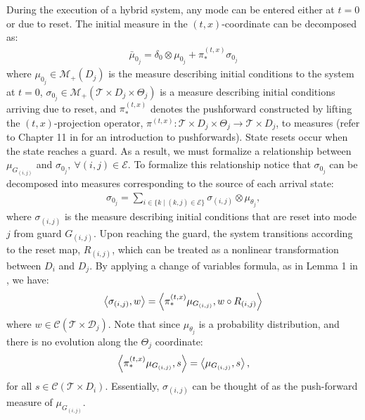 During the execution of a hybrid system, any mode can be entered either at $t=0$ or due to reset.
The initial measure in the $(t,x)$-coordinate can be decomposed as:
\begin{align}
  \bar\mu_{0_j}=\delta_0\otimes\mu_{0_j}+\pi^{(t,x)}_*\sigma_{0_j}
\end{align}
where $\mu_{0_j}\in \mathcal M_+(D_j)$ is the measure describing initial conditions to the system at $t=0$, $\sigma_{0_j}\in \mathcal M_+(\mathcal T\times D_j\times \Theta_j)$ is a measure describing initial conditions arriving due to reset, and $\pi^{(t,x)}_*$ denotes the pushforward constructed by lifting the $(t,x)$-projection operator, $\pi^{(t,x)}: \mathcal T\times D_j\times \Theta_j \to \mathcal T\times D_j$, to measures (refer to Chapter 11 in \cite{lee2003smooth} for an introduction to pushforwards). 
State resets occur when the state reaches a guard. 
As a result, we must formalize a relationship between $\mu_{ G_{(i,j)}}$ and $\sigma_{0_j},~\forall (i,j)\in \mathcal E$.
To formalize this relationship notice that $\sigma_{0_j}$ can be decomposed into measures corresponding to the source of each arrival state:
\begin{align}
  \sigma_{0_j}=\sum_{i\in \{k\mid (k,j)\in \mathcal E\}} \sigma_{(i,j)}\otimes \mu_{\theta_j},
\end{align}
where $\sigma_{(i,j)}$ is the measure describing initial conditions that are reset into mode $j$ from guard $G_{(i,j)}$.
Upon reaching the guard, the system transitions according to the reset map, $R_{(i,j)}$, which can be treated as a nonlinear transformation between $D_i$ and $D_j$.
By applying a change of variables formula, as in Lemma 1 in \cite{shia2014convex}, we have:
\begin{align}
    \left\langle \sigma_{(i,j)},w\right\rangle=\left\langle \pi^{(t,x)}_*\mu_{ G_{(i,j)}},w\circ R_{(i,j)}\right\rangle
    \label{eq:reset_measure}
\end{align}
where $w\in \mathcal C(\mathcal T\times \mathcal D_j)$.
Note that since $\mu_{\theta_j}$ is a probability distribution, and there is no evolution along the $\Theta_j$ coordinate:
\begin{equation}
  \left\langle \pi^{(t,x)}_*\mu_{ G_{(i,j)}},s\right\rangle=\left\langle \mu_{ G_{(i,j)}},s\right\rangle,
\end{equation}
for all $s\in \mathcal C(\mathcal T\times D_i)$. Essentially, $\sigma_{(i,j)}$ can be thought of as the push-forward measure of $\mu_{ G_{(i,j)}}$.

